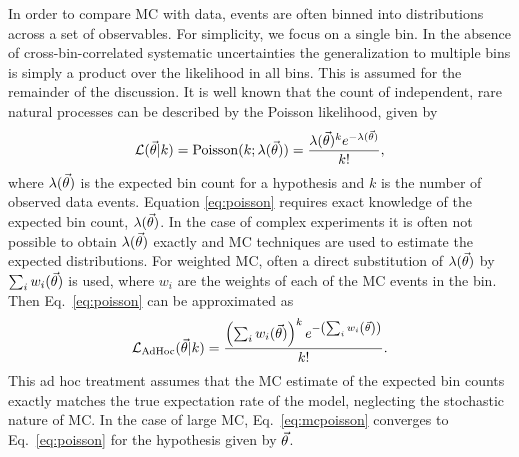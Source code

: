 In order to compare MC with data, events are often binned into distributions across a set of observables.
For simplicity, we focus on a single bin.
In the absence of cross-bin-correlated systematic uncertainties the generalization to multiple bins is simply a product over the likelihood in all bins.
This is assumed for the remainder of the discussion.
It is well known that the count of independent, rare natural processes can be described by the Poisson likelihood, given by
\begin{equation}
\label{eq:poisson}
\mathcal{L}(\vec{\theta}|k) = \mathrm{Poisson}(k;\lambda(\vec{\theta})) = \frac{\lambda(\vec{\theta})^{k}e^{-\lambda(\vec{\theta})}}{k!},
\end{equation}
where $\lambda(\vec{\theta})$ is the expected bin count for a hypothesis and $k$ is the number of observed data events.
Equation \eqref{eq:poisson} requires exact knowledge of the expected bin count, $\lambda(\vec{\theta})$.
In the case of complex experiments it is often not possible to obtain $\lambda(\vec{\theta})$ exactly and MC techniques are used to estimate the expected distributions.
For weighted MC, often a direct substitution of $\lambda(\vec{\theta})$ by $\sum_i{w_i(\vec{\theta})}$ is used, where $w_i$ are the weights of each of the MC events in the bin.
Then Eq.~\eqref{eq:poisson} can be approximated as
\begin{equation} \label{eq:mcpoisson}
\mathcal{L}_{\textmd{AdHoc}}(\vec{\theta}|k) = \frac{\left(\sum_{i}{w_i(\vec{\theta})}\right)^{k}e^{-\left(\sum_{i}{w_i\left(\vec{\theta}\right)}\right)}}{k!}.
\end{equation}
This ad hoc treatment assumes that the MC estimate of the expected bin counts exactly matches the true expectation rate of the model, neglecting the stochastic nature of MC.
In the case of large MC, Eq.~\eqref{eq:mcpoisson} converges to Eq.~\eqref{eq:poisson} for the hypothesis given by $\vec{\theta}$.
